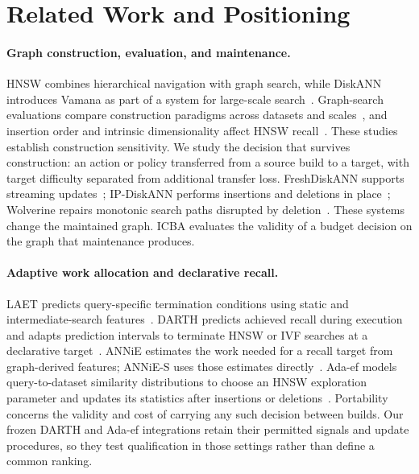 \section{Related Work and Positioning}
\label{sec:related}

\paragraph{Graph construction, evaluation, and maintenance.}
HNSW combines hierarchical navigation with graph search, while DiskANN introduces Vamana as part of a system for large-scale search~\cite{malkov2020hnsw,subramanya2019diskann}. Graph-search evaluations compare construction paradigms across datasets and scales~\cite{azizi2025evaluation}, and insertion order and intrinsic dimensionality affect HNSW recall~\cite{elliott2024ordering}. These studies establish construction sensitivity. We study the decision that survives construction: an action or policy transferred from a source build to a target, with target difficulty separated from additional transfer loss. FreshDiskANN supports streaming updates~\cite{singh2021freshdiskann}; IP-DiskANN performs insertions and deletions in place~\cite{xu2025ipdiskann}; Wolverine repairs monotonic search paths disrupted by deletion~\cite{liu2025wolverine}. These systems change the maintained graph. ICBA evaluates the validity of a budget decision on the graph that maintenance produces.

\paragraph{Adaptive work allocation and declarative recall.}
LAET predicts query-specific termination conditions using static and intermediate-search features~\cite{li2020laet}. DARTH predicts achieved recall during execution and adapts prediction intervals to terminate HNSW or IVF searches at a declarative target~\cite{chatzakis2025darth}. ANNiE estimates the work needed for a recall target from graph-derived features; ANNiE-S uses those estimates directly~\cite{wang2026annie}. Ada-ef models query-to-dataset similarity distributions to choose an HNSW exploration parameter and updates its statistics after insertions or deletions~\cite{zhang2026adaef}. Portability concerns the validity and cost of carrying any such decision between builds. Our frozen DARTH and Ada-ef integrations retain their permitted signals and update procedures, so they test qualification in those settings rather than define a common ranking.

